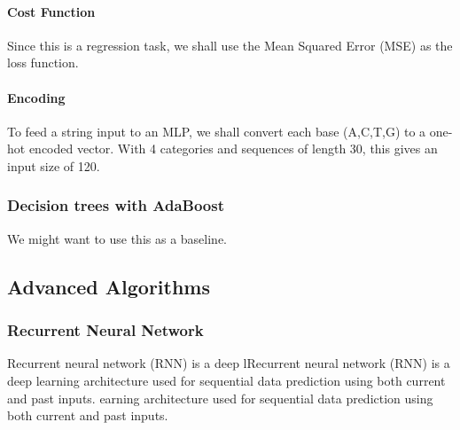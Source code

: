 \documentclass{article}
\begin{document}
\paragraph{Cost Function}
Since this is a regression task, we shall use the Mean Squared Error (MSE) as the loss function.

\paragraph{Encoding}
To feed a string input to an MLP, we shall convert each base (A,C,T,G) to a one-hot encoded vector. With 4 categories and sequences of length 30, this gives an input size of 120.


\subsubsection{Decision trees with AdaBoost}
We might want to use this as a baseline. 


\subsection{Advanced Algorithms}

\subsubsection{Recurrent Neural Network}
Recurrent neural network (RNN) is a deep lRecurrent neural network 
(RNN) is a deep learning architecture used for sequential data prediction
using both current and past inputs. earning architecture used for sequential 
data prediction using both current and past inputs. 
\end{document}
